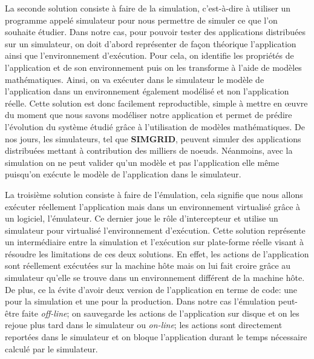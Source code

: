 {\color{red}La seconde solution consiste à faire de la simulation, c'est-à-dire à utiliser un programme appelé simulateur pour nous permettre de simuler ce que l'on souhaite étudier.} Dans notre cas, pour pouvoir tester des applications distribuées sur un simulateur, on doit d'abord représenter de façon théorique l'application ainsi que l'environnement d'exécution. Pour cela, on identifie les propriétés de l'application et de son environnement puis on les transforme à l'aide de modèles mathématiques. Ainsi, on va exécuter dans le simulateur le modèle de l'application dans un environnement également modélisé et non l'application réelle. Cette solution est donc facilement reproductible, simple à mettre en \oe uvre du moment que nous savons modéliser notre application et permet de prédire l'évolution du système étudié grâce à l'utilisation de modèles mathématiques. De nos jours, les simulateurs, tel que  \textbf{SIMGRID}\cite{SIMULATION:CASANOVA, SIMULATION:MARTIN}, peuvent simuler des applications distribuées mettant à contribution des milliers de noeuds. Néanmoins, avec la simulation on ne peut valider qu'un modèle et pas l'application elle même puisqu'on exécute le modèle de l'application dans le simulateur. 

La troisième solution consiste à faire de l'émulation, cela signifie que nous allons exécuter réellement l'application mais dans un environnement virtualisé grâce à un logiciel, l'émulateur. Ce dernier joue le rôle d'intercepteur et utilise un simulateur pour virtualisé l'environnement d'exécution.
Cette solution représente un intermédiaire entre la simulation et l'exécution sur plate-forme réelle visant à résoudre les limitations de ces deux solutions. En effet, les actions de l'application sont réellement exécutées sur la machine hôte mais on lui fait croire grâce au simulateur qu'elle se trouve dans un environnement différent de la machine hôte. De plus, ce la évite d'avoir deux version de l'application en terme de code: une pour la simulation et une pour la production. Dans notre cas l'émulation peut-être faite \textit{off-line}; on sauvegarde les actions de l'application sur disque et on les rejoue plus tard dans le simulateur ou \textit{on-line}; les actions sont directement reportées dans le simulateur et on bloque l'application durant le temps nécessaire calculé par le simulateur.

